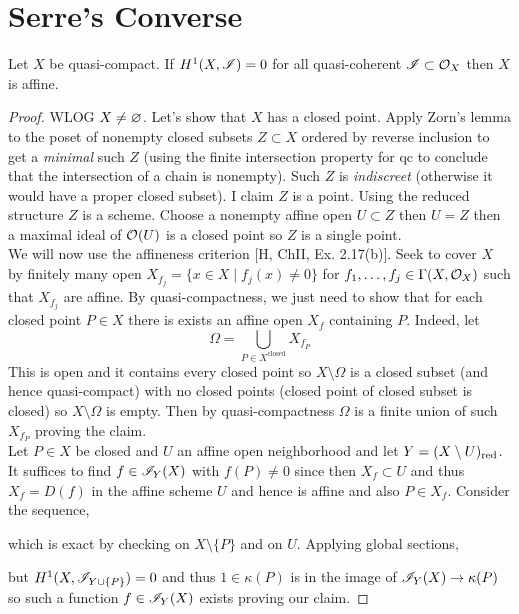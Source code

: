 \documentclass[12pt]{article}
\begin{document}
\section{Serre's Converse}

\begin{thm}
Let $X$ be quasi-compact. If $H^1(X, \mathscr{I}) = 0$ for all quasi-coherent $\mathscr{I} \subset \mathcal{O}_{X}$ then $X$ is affine.
\end{thm}

\begin{proof}
WLOG $X \neq \varnothing$. Let's show that $X$ has a closed point. Apply Zorn's lemma to the poset of nonempty closed subsets $Z \subset X$ ordered by reverse inclusion to get a \textit{minimal} such $Z$ (using the finite intersection property for qc to conclude that the intersection of a chain is nonempty). Such $Z$ is \textit{indiscreet} (otherwise it would have a proper closed subset). I claim $Z$ is a point. Using the reduced structure $Z$ is a scheme. Choose a nonempty affine open $U \subset Z$ then $U = Z$ then a maximal ideal of $\mathcal{O}_{}(U)$ is a closed point so $Z$ is a single point.
\bigskip\\
We will now use the affineness criterion [H, ChII, Ex. 2.17(b)]. Seek to cover $X$ by finitely many open $X_{f_j} = \{ x \in X \mid f_j(x) \neq 0 \}$ for $f_1, \dots, f_j \in \Gamma(X, \mathcal{O}_{X})$ such that $X_{f_j}$ are affine. By quasi-compactness, we just need to show that for each closed point $P \in X$ there is exists an affine open $X_f$ containing $P$. Indeed, let
\[ \Omega = \bigcup_{P \in X^{\text{closed}}} X_{f_P} \]
This is open and it contains every closed point so $X \setminus \Omega$ is a closed subset (and hence quasi-compact) with no closed points (closed point of closed subset is closed) so $X \setminus \Omega$ is empty. Then by quasi-compactness $\Omega$ is a finite union of such $X_{f_P}$ proving the claim.
\bigskip\\
Let $P \in X$ be closed and $U$ an affine open neighborhood and let $Y = (X \setminus U)_{\mathrm{red}}$. It suffices to find $f \in \mathscr{I}_Y(X)$ with $f(P) \neq 0$ since then $X_f \subset U$ and thus $X_f = D(f)$ in the affine scheme $U$ and hence is affine and also $P \in X_f$. Consider the sequence,
\begin{center}
\end{center}
which is exact by checking on $X \setminus \{ P \}$ and on $U$. Applying global sections,
\begin{center}
\end{center}
but $H^1(X, \mathscr{I}_{Y \cup \{ P \}}) = 0$ and thus $1 \in \kappa(P)$ is in the image of $\mathscr{I}_Y(X) \to \kappa(P)$ so such a function $f \in \mathscr{I}_Y(X)$ exists proving our claim. 
\end{proof}
\end{document}
